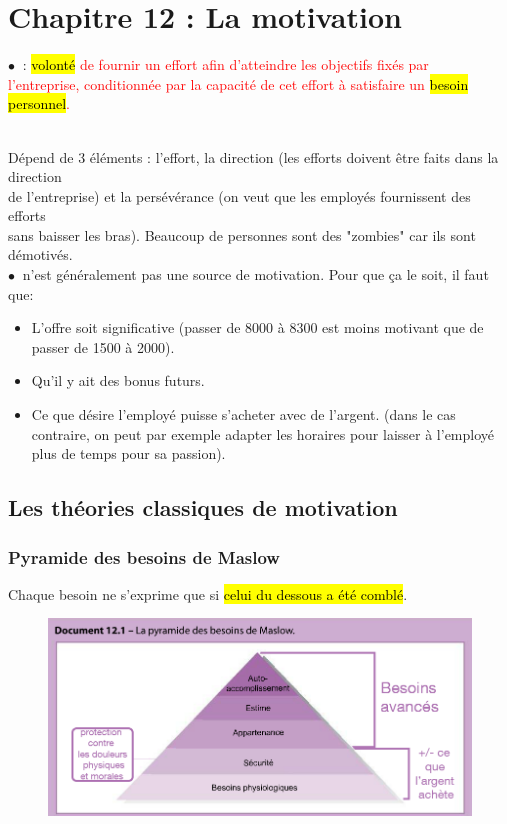 \documentclass[letterpaper, 12pt]{article}
\newcommand{\myul}[1]{
	\underline{\smash{#1}}
}
\newcommand{\red}[1]{
	\textcolor{red}{#1}
}
\newcommand{\point}{$\bullet\ $}
\newcommand{\alinea}{
\hspace*{0.3cm}}
\begin{document}
\section{Chapitre 12 : La motivation}
	\point \myul{Motivation} : \red{\hl{volont\'e} de fournir un effort afin d'atteindre les objectifs 
		fixés par \\\alinea l'entreprise, conditionn\'ee par la capacit\'e de cet effort à satisfaire
		un \hl{besoin personnel}.}
		\\\alinea Dépend de 3 \'el\'ements : l'effort, la direction (les efforts doivent être faits dans
		la direction \\\alinea de l'entreprise) et la pers\'ev\'erance (on veut que les employ\'es
		fournissent des efforts\\\alinea sans baisser les bras). Beaucoup de personnes sont des 
		"zombies" car ils sont démotivés.\\
	\point \myul{L'argent} n'est généralement pas une source de motivation. Pour que ça le soit, il
		faut que: 
		\vspace*{-0.3cm}\begin{itemize}
			\setlength{\itemsep}{0pt}
			\setlength{\parskip}{0pt}
			\setlength{\parsep}{0pt}
			\item L'offre soit significative (passer de 8000 à 8300 est moins motivant que de passer de 
				1500 à 2000).
			\item Qu'il y ait des bonus futurs.
			\item Ce que désire l'employé puisse s'acheter avec de l'argent. (dans le cas
				contraire, on peut par exemple adapter les horaires pour laisser à l'employé plus de 
				temps pour sa passion).
		\end{itemize}
	\subsection{Les théories classiques de motivation}
		\subsubsection{Pyramide des besoins de Maslow}
			Chaque besoin ne s'exprime que si \hl{celui du dessous a \'et\'e combl\'e}.
			\begin{figure}[H]
				\centering
				\includegraphics[scale=0.75]{Images/pyramide}
			\end{figure}\noindent
\end{document}
